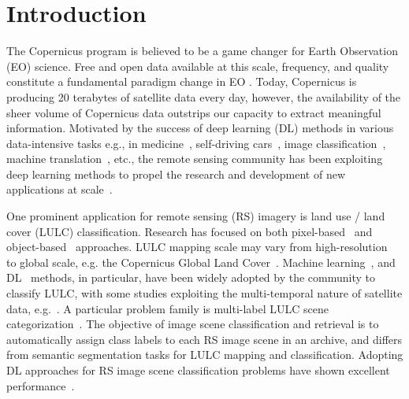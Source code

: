 \documentclass[journal]{IEEEtran}
\begin{document}
\section{Introduction}
\label{sec:intro}

\label{sec:introduction}
The Copernicus program is believed to be a game changer for Earth Observation (EO) science. Free and open data available at this scale, frequency, and quality constitute a fundamental paradigm change in EO \citep{nerc523287}. Today, Copernicus is producing 20 terabytes of satellite data every day, however, the availability of the sheer volume of Copernicus data outstrips our capacity to extract meaningful information.
Motivated by the success of deep learning (DL) methods in various data-intensive tasks e.g., in medicine~\citep{Esteva2019}, self-driving cars~\citep{Maqueda_2018_CVPR}, image classification~\citep{DBLP:journals/corr/abs-1712-04621}, machine translation~\citep{DBLP:journals/corr/abs-1803-07416}, etc., the remote sensing community has been exploiting deep learning methods to propel the research and development of new applications at scale~\citep{8113128}.

One prominent application for remote sensing (RS) imagery is land use / land cover (LULC) classification. Research has focused on both pixel-based~\citep{KHATAMI201689} and object-based~\citep{rs7010153} approaches. LULC mapping scale may vary from high-resolution~\citep{TONG2020111322} to global scale, e.g. the Copernicus Global Land Cover~\citep{rs12061044}. Machine learning~\citep{rs12071135}, and DL~\citep{7891032} methods, in particular, have been widely adopted by the community to classify LULC, with some studies exploiting the multi-temporal nature of satellite data, e.g.~\cite{8006221}. A particular problem family is multi-label LULC scene categorization~\citep{8633359}. The objective of image scene classification and retrieval is to automatically assign class labels to each RS image scene in an archive, and differs from semantic segmentation tasks for LULC mapping and classification. Adopting DL approaches for RS image scene classification problems have shown excellent performance~\citep{8730481}.
\end{document}
